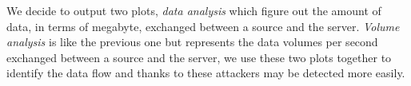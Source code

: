We decide to output two plots, \textit{data analysis} which figure out the amount of data, in terms of megabyte, exchanged between a source and the server. \textit{Volume analysis} is like the previous one but represents the data volumes per second exchanged between a source and the server, we use these two plots together to identify the data flow and thanks to these attackers may be detected more easily.
